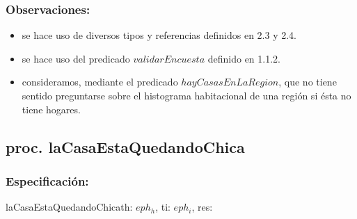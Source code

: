 \documentclass[a4paper]{article}
\begin{document}
    \subsubsection{Observaciones:}
        \begin{itemize}
            \item se hace uso de diversos tipos y referencias definidos en 2.3 y 2.4.
            \item se hace uso del predicado $validarEncuesta$ definido en 1.1.2.
            \item consideramos, mediante el predicado $hayCasasEnLaRegion$, que no tiene sentido preguntarse sobre el 
            histograma habitacional de una regi\'on si \'esta no tiene hogares.
        \end{itemize}


\pagebreak
\subsection{proc. laCasaEstaQuedandoChica}

    \subsubsection{Especificaci\'on:}
        \begin{proc}{laCasaEstaQuedandoChica}{\In th: $eph_{h}$, \In ti: $eph_{i}$, \Out res: \TLista{\float}}{}
        \end{proc}
\end{document}
